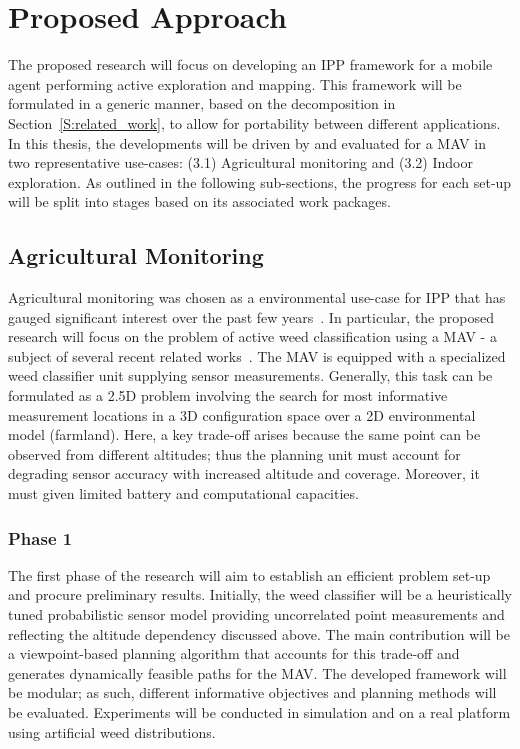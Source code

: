 \section{Proposed Approach}
\label{S:proposed_approach}

The proposed research will focus on developing an IPP framework for a mobile agent 
performing active exploration and mapping. This framework will be formulated in a 
generic manner, based on the decomposition in Section~\ref{S:related_work}, to allow for portability between 
different applications. In this thesis, the developments will be driven by and evaluated for a MAV in two 
representative use-cases: (3.1) Agricultural monitoring and (3.2) Indoor exploration.  As outlined in the 
following sub-sections, the progress for each set-up will be split into stages based on its associated work 
packages.

\newpage

\subsection{Agricultural Monitoring}

Agricultural monitoring was chosen as a environmental use-case for IPP that 
has gauged significant interest over the past few years~\cite{Detweiler2015, Cardina1997, Anthony2014}. 
In particular, the proposed research will focus on the problem of active weed classification using a 
MAV - a subject of several recent related works~\cite{Vivaldini2016, Sadat2015}. The MAV is 
equipped with a specialized weed classifier unit supplying sensor measurements. Generally, this task can be 
formulated as a 2.5D problem involving the 
search for most informative measurement locations in a 3D configuration space over a 2D environmental model 
(farmland). Here, a key trade-off arises because the same point can be observed from different altitudes; thus 
the planning unit must account for degrading sensor accuracy with increased altitude and coverage. Moreover, 
it must given limited battery and computational capacities.

\subsubsection{Phase 1}

The first phase of the research will aim to establish an efficient problem set-up and procure 
preliminary results. Initially, the weed classifier will be a heuristically tuned probabilistic sensor model 
providing uncorrelated point measurements and reflecting the altitude dependency discussed above. The main 
contribution will be a viewpoint-based planning algorithm that accounts for this trade-off and generates 
dynamically feasible paths for the MAV. The developed framework will be modular; as such, different 
informative objectives and planning methods will be evaluated. Experiments will be conducted in simulation and 
on a real platform using artificial weed distributions.

